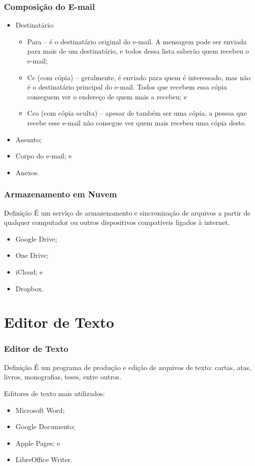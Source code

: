 \documentclass[aspectratio=169]{beamer} %
\begin{document}
\begin{frame}
	\frametitle{Composi\c cão do E-mail}

	\begin{itemize}
		\item Destinatário:
		\begin{itemize}
			\item Para -- é o destinatário original do e-mail. A mensagem pode ser enviada para mais de um destinatário, e todos dessa lista saberão quem recebeu o e-mail;
			\item Cc (com cópia) -- geralmente, é enviado para quem é interessado, mas não é o destinatário principal do e-mail. Todos que recebem essa cópia conseguem ver o endereço de quem mais a recebeu; e
			\item Cco (com cópia oculta) -- apesar de também ser uma cópia, a pessoa que recebe esse e-mail não consegue ver quem mais recebeu uma cópia deste.
		\end{itemize}
		\item Assunto;
		\item Corpo do e-mail; e
		\item Anexos.
	\end{itemize}
\end{frame}

\begin{frame}
	\frametitle{Armazenamento em Nuvem}

	\begin{block}{Defini\c cão}
		É um serviço de armazenamento e sincronização de arquivos a partir de qualquer computador ou outros dispositivos compatíveis ligados à internet.
	\end{block} \vfill

	\begin{itemize}
		\item Google Drive;
		\item One Drive;
		\item iCloud; e
		\item Dropbox.
	\end{itemize}
\end{frame}


\section{Editor de Texto}

\begin{frame}
	\frametitle{Editor de Texto}
	
	\begin{block}{Defini\c cão}
		É um programa de produ\c cão e edição de arquivos de texto: cartas, atas,  livros, monografias, teses,  entre outros.
	\end{block} \vfill
		
	Editores de texto mais utilizados:
	\begin{itemize}
		\item Microsoft Word;
		\item Google Documento;
		\item Apple Pages; e
		\item LibreOffice Writer.
	\end{itemize}
\end{frame}
\end{document}
